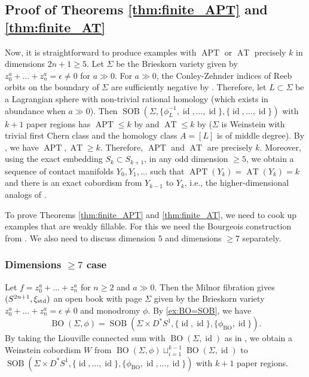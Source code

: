 \documentclass[11pt]{amsart}
\numberwithin{equation}{section}
\def\std{\rm std}
\DeclareMathOperator{\Id}{id}
\DeclareMathOperator{\APT}{APT}
\DeclareMathOperator{\AT}{AT}
\DeclareMathOperator{\BO}{BO}
\DeclareMathOperator{\SOB}{SOB}
\begin{document}
\subsection{Proof of Theorems \ref{thm:finite_APT} and \ref{thm:finite_AT}}
Now, it is straightforward to produce examples with $\APT$ or $\AT$ precisely $k$ in dimensions $2n+1 \ge 5$. Let $\Sigma$ be the Brieskorn variety given by $z_0^{a}+\ldots+z_n^a =\epsilon \ne 0$ for $a\gg 0$. For $a\gg 0$, the Conley-Zehnder indices of Reeb orbits on the boundary of $\Sigma$ are sufficiently negative by \cite[(14)]{zbMATH06571536}. Therefore, let $L\subset \Sigma$ be a Lagrangian sphere with non-trivial rational homology (which exists in abundance when $a\gg 0$). Then $\SOB(\Sigma, \{\phi_L^{-1},\Id, \ldots, \Id\}, \{\Id,\ldots,\Id\})$ with $k+1$ paper regions has $\APT\le k$ by  and $\AT\le k$ by  ($\Sigma$ is Weinstein with trivial first Chern class and the homology class $A=[L]$ is of middle degree). By , we have $\APT,\AT\ge k$. Therefore, $\APT$ and $\AT$ are precisely $k$. Moreover, using the exact embedding $S_k\subset S_{k+1}$, in any odd dimension $\ge 5$, we obtain a sequence of contact manifolds $Y_0,Y_1,\ldots$ such that $\APT(Y_k)=\AT(Y_k)=k$ and there is an exact cobordism from $Y_{k-1}$ to $Y_k$, i.e., the higher-dimensional analogs of \cite[Theorem 1, Remark 1.6]{LW}.

To prove Theorems \ref{thm:finite_APT} and \ref{thm:finite_AT}, we need to cook up examples that are weakly fillable. For this we need the Bourgeois construction from . We also need to discuss dimension $5$ and dimensions $\ge 7$ separately.
\subsubsection{Dimensions $\ge 7$ case}\label{sss:dim7}
Let $f=z_0^{a}+\ldots+z_n^a$ for $n\ge 2$ and $a\gg 0$. Then the Milnor fibration gives $(S^{2n+1},\xi_{\std})$ an open book with page $\Sigma$ given by the Brieskorn variety $z_0^{a}+\ldots+z_n^a=\epsilon\ne 0$ and monodromy $\phi$. By \eqref{ex:BO=SOB}, we have $$\BO(\Sigma,\phi)=\SOB(\Sigma \times D^*S^1, \{\Id,\Id\},\{\phi_{\BO},\Id\}).$$ 
By taking the Liouville connected sum with $\BO(\Sigma,\Id)$ as in , we obtain a Weinstein cobordism $W$ from 
$\BO(\Sigma,\phi) \sqcup_{i=1}^{k-1} \BO(\Sigma,\Id)$
to $\SOB(\Sigma \times D^*S^1, \{\Id,\ldots,\Id\}, \{\phi_{\BO},\Id,\ldots,\Id\})$ with $k+1$ paper regions. 
\end{document}
